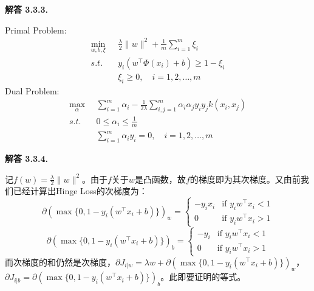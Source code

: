 \documentclass[12pt, a4paper, oneside]{ctexart}
\newenvironment{solution}[1]{\par\noindent\textbf{解答 #1. }\par}{\par}
\begin{document}
\begin{solution}{3.3.3}
    Primal Problem: 
    \begin{align}
        \min_{w, b, \xi} \ & \frac{\lambda}{2} \| w \|^2 + \frac{1}{m} \sum_{i=1}^{m} \xi_i \nonumber \\
        s.t. \quad & y_i(w^\top \Phi(x_i) + b) \geq 1 - \xi_i \nonumber \\
        & \xi_i \geq 0, \quad i = 1, 2, \dots, m \nonumber
    \end{align}
    Dual Problem:
    \begin{align}
        \max_{\alpha} \ & \sum_{i=1}^{m} \alpha_i - \frac{1}{2\lambda} \sum_{i,j=1}^{m}\alpha_i \alpha_j y_i y_j k(x_i, x_j)\nonumber \\
        s.t. \quad & 0 \leq \alpha_i \leq \frac{1}{m} \nonumber \\
        \quad \quad & \sum_{i=1}^{m} \alpha_i y_i = 0, \quad i = 1, 2, \dots, m \nonumber
    \end{align}
\end{solution}

\begin{solution}{3.3.4}
    记$f(w) = \frac{\lambda}{2} \| w \| ^ 2$。由于$f$关于$w$是凸函数，故$f$的梯度即为其次梯度。又由前我们已经计算出Hinge Loss的次梯度为：
    \begin{equation}
        \partial (\max \{ 0, 1 - y_i(w^\top x_i + b) \})_w = 
        \begin{cases}
            -y_ix_i & \text{if $y_iw^\top x_i < 1$} \\
            0 & \text{if $y_iw^\top x_i > 1$}
        \end{cases} \nonumber
    \end{equation}
    \begin{equation}
        \partial (\max \{ 0, 1 - y_i(w^\top x_i + b) \})_b = 
        \begin{cases}
            -y_i & \text{if $y_iw^\top x_i < 1$} \\
            0 & \text{if $y_iw^\top x_i > 1$}
        \end{cases} \nonumber
    \end{equation}
    而次梯度的和仍然是次梯度，$\partial J_{i|w} = \lambda w + \partial (\max \{ 0, 1 - y_i(w^\top x_i + b) \})_w$，$\partial J_{i|b} = \partial (\max \{ 0, 1 - y_i(w^\top x_i + b) \})_b$。此即要证明的等式。
\end{solution}
\end{document}
